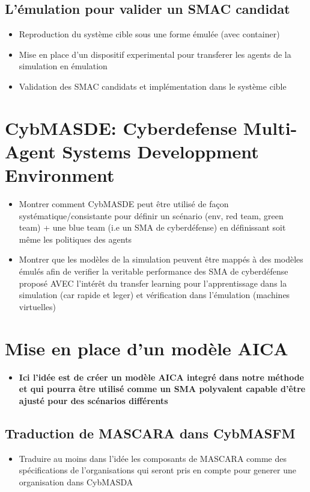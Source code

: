 \documentclass[runningheads]{llncs}
\begin{document}
\subsection{L'émulation pour valider un SMAC candidat}
\begin{itemize}

    \item Reproduction du système cible sous une forme émulée (avec container)
    \item Mise en place d'un dispositif experimental pour transferer les agents de la simulation en émulation
    \item Validation des SMAC candidats et implémentation dans le système cible

\end{itemize}


\section{CybMASDE: Cyberdefense Multi-Agent Systems Developpment Environment}
\begin{itemize}

    \item Montrer comment CybMASDE peut être utilisé de façon systématique/consistante pour définir un scénario (env, red team, green team) + une blue team (i.e un SMA de cyberdéfense) en définissant soit même les politiques des agents
    \item Montrer que les modèles de la simulation peuvent être mappés à des modèles émulés afin de verifier la veritable performance des SMA de cyberdéfense proposé AVEC l'intérêt du transfer learning pour l’apprentissage dans la simulation (car rapide et leger) et vérification dans l’émulation (machines virtuelles)
\end{itemize}



\section{Mise en place d'un modèle AICA}
\begin{itemize}

    \item \textbf{Ici l'idée est de créer un modèle AICA integré dans notre méthode et qui pourra être utilisé comme un SMA polyvalent capable d'être ajusté pour des scénarios différents}
\end{itemize}
\subsection{Traduction de MASCARA dans CybMASFM}
\begin{itemize}

    \item Traduire au moins dans l'idée les composants de MASCARA comme des spécifications de l'organisations qui seront pris en compte pour generer une organisation dans CybMASDA
\end{itemize}
\end{document}
